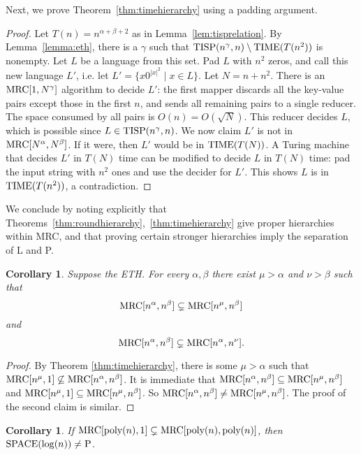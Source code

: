 \documentclass[11pt]{article}
\newtheorem{corollary}[theorem]{Corollary}
\theoremstyle{definition}
\theoremstyle{remark}
\newcommand{\mrc}{\textup{MRC}}
\newcommand{\TIME}{\textup{TIME}}
\newcommand{\TISP}{\textup{TISP}}
\renewcommand{\P}{\textup{P}}
\renewcommand{\L}{\textup{SPACE}(\log(n))}
\begin{document}
Next, we prove Theorem~\ref{thm:timehierarchy} using a padding argument.

\begin{proof}
Let $T(n) = n^{\alpha + \beta + 2}$ as in Lemma~\ref{lem:tisprelation}. By
Lemma~\ref{lemma:eth}, there is a $\gamma$ such that $\TISP(n^\gamma,
n)\setminus\TIME(T(n^{2}))$ is nonempty.  Let $L$ be a language from this set.
Pad $L$ with $n^{2}$ zeros, and call this new language $L'$, i.e. let $L' = \{x
0^{|x|^{2}} \mid x \in  L\}$. Let $N = n + n^{2}$. There is an $\mrc[1,
N^\gamma]$ algorithm to decide $L'$: the first mapper discards all the
key-value pairs except those in the first $n$, and sends all remaining pairs to
a single reducer. The space consumed by all pairs is $O(n) = O(\sqrt{N})$. This
reducer decides $L$, which is possible since $L \in \TISP(n^\gamma, n)$. We now
claim $L'$ is not in $\mrc[N^\alpha, N^\beta]$. If it were, then $L'$ would be
in $\TIME(T(N))$. A Turing machine that decides $L'$ in $T(N)$ time can be
modified to decide $L$ in $T(N)$ time: pad the input string with $n^{2}$ ones
and use the decider for $L'$. This shows $L$ is in $\TIME(T(n^{2}))$, a
contradiction.  \end{proof}

We conclude by noting explicitly that
Theorems~\ref{thm:roundhierarchy},~\ref{thm:timehierarchy} give proper
hierarchies within MRC, and that proving certain stronger hierarchies imply the
separation of L and P.

\begin{corollary} \label{cor:mrchierarchy}
Suppose the ETH. For every $\alpha, \beta$ there exist $\mu>\alpha$ and $\nu>\beta$
such that $$\mrc[n^\alpha, n^\beta] \subsetneq \mrc[n^\mu, n^\beta]$$ and
$$\mrc[n^\alpha, n^\beta] \subsetneq \mrc[n^\alpha, n^\nu].$$
\end{corollary}

\begin{proof}
By Theorem \ref{thm:timehierarchy}, there is some $\mu > \alpha$ such that
$\mrc[n^\mu, 1] \not\subseteq \mrc[n^\alpha, n^\beta]$.  It is immediate that
$\mrc[n^\alpha, n^\beta] \subseteq \mrc[n^\mu, n^\beta]$ and
$\mrc[n^\mu,1]\subseteq\mrc[n^\mu,n^\beta]$.  So $\mrc[n^\alpha,n^\beta]\neq
\mrc[n^\mu, n^\beta]$.  The proof of the second claim is similar.
\end{proof}


\begin{corollary} \label{cor:lvsp}
If $\mrc[\textup{poly}(n), 1] \subsetneq \mrc[\textup{poly}(n),
\textup{poly}(n)]$, then $\L \neq \P$.
\end{corollary}
\end{document}
